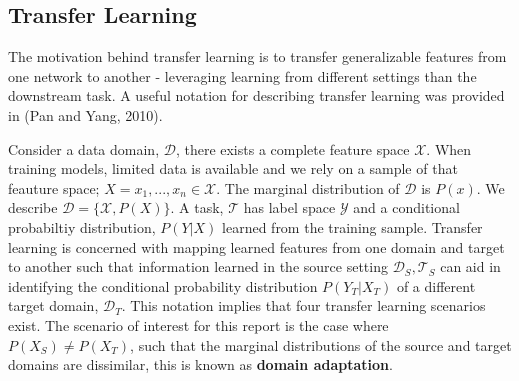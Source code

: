 \subsection{Transfer Learning}
The motivation behind transfer learning is to transfer generalizable features from one network to another - leveraging learning from different settings than the downstream task. 
A useful notation for describing transfer learning was provided in (Pan and Yang, 2010)\autocite{PanYang2010}. 

Consider a data domain, $\mathcal{D}$, there exists a complete feature space $\mathcal{X}$. 
When training models, limited data is available and we rely on a sample of that feauture space; $X = x_{1},...,x_{n} \in \mathcal{X}$.
The marginal distribution of $\mathcal{D}$ is $P(x)$. We describe $\mathcal{D} = \{\mathcal{X}, P(X)\}$. 
A task, $\mathcal{T}$ has label space $\mathcal{Y}$ and a conditional probabiltiy distribution, $P(Y|X)$ learned from the training sample.
\newline
Transfer learning is concerned with mapping learned features from one domain and target to another such that information learned in the source setting $\mathcal{D}_S, \mathcal{T}_S$ can aid in identifying the conditional probability distribution $P(Y_{T}|X_{T})$ of a different target domain, $\mathcal{D}_T$.
\newline
This notation implies that four transfer learning scenarios exist. 
The scenario of interest for this report is the case where $P(X_{S}) \neq P(X_{T})$, such that the marginal distributions of the source and target domains are dissimilar, this is known as \textbf{domain adaptation}. 



